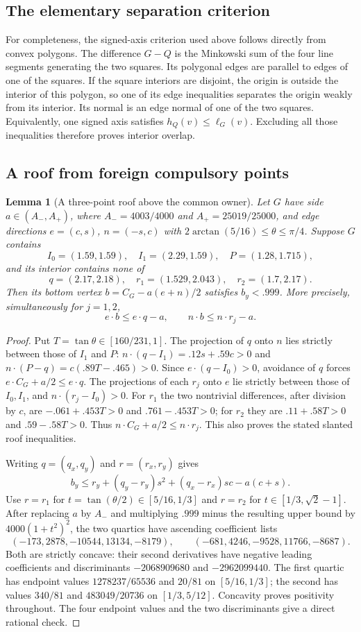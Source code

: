 \documentclass[11pt]{article}
\newtheorem{lemma}[theorem]{Lemma}
\begin{document}
\subsection{The elementary separation criterion}
For completeness, the signed-axis criterion used above follows directly
from convex polygons. The difference $G-Q$ is the Minkowski sum of the
four line segments generating the two squares. Its polygonal edges are
parallel to edges of one of the squares. If the square interiors are
disjoint, the origin is outside the interior of this polygon, so one of
its edge inequalities separates the origin weakly from its interior.
Its normal is an edge normal of one of the two squares. Equivalently,
one signed axis satisfies $h_Q(v)\le\ell_G(v)$. Excluding all those
inequalities therefore proves interior overlap.

\subsection{A roof from foreign compulsory points}
\begin{lemma}[A three-point roof above the common owner]\label{lem:root-roof}
Let $G$ have side $a\in(A_-,A_+)$, where
$A_-=4003/4000$ and $A_+=25019/25000$, and edge directions
$e=(c,s)$, $n=(-s,c)$ with
$2\arctan(5/16)\le\theta\le\pi/4$.
Suppose $G$ contains
\[
 I_0=(1.59,1.59),\quad I_1=(2.29,1.59),\quad P=(1.28,1.715),
\]
and its interior contains none of
\[
 q=(2.17,2.18),\quad r_1=(1.529,2.043),\quad r_2=(1.7,2.17).
\]
Then its bottom vertex $b=C_G-a(e+n)/2$ satisfies $b_y<.999$.
More precisely, simultaneously for $j=1,2$,
\[
 e\cdot b\le e\cdot q-a,\qquad n\cdot b\le n\cdot r_j-a.
\]
\end{lemma}
\begin{proof}
Put $T=\tan\theta\in[160/231,1]$. The projection of $q$ onto
$n$ lies strictly between those of $I_1$ and $P$:
$n\cdot(q-I_1)=.12s+.59c>0$ and
$n\cdot(P-q)=c(.89T-.465)>0$.
Since $e\cdot(q-I_0)>0$, avoidance of $q$ forces
$e\cdot C_G+a/2\le e\cdot q$.
The projections of each $r_j$ onto $e$ lie strictly between those
of $I_0,I_1$, and $n\cdot(r_j-I_0)>0$.
For $r_1$ the two nontrivial differences, after division by $c$,
are $-.061+.453T>0$ and $.761-.453T>0$;
for $r_2$ they are $.11+.58T>0$ and $.59-.58T>0$.
Thus $n\cdot C_G+a/2\le n\cdot r_j$.
This also proves the stated slanted roof inequalities.

Writing $q=(q_x,q_y)$ and $r=(r_x,r_y)$ gives
\[
 b_y\le r_y+(q_y-r_y)s^2+(q_x-r_x)sc-a(c+s).
\]
Use $r=r_1$ for $t=\tan(\theta/2)\in[5/16,1/3]$ and
$r=r_2$ for $t\in[1/3,\sqrt2-1]$.
After replacing $a$ by $A_-$ and multiplying $.999$ minus the resulting upper bound by $4000(1+t^2)^2$, the two quartics have ascending
coefficient lists
\[
 (-173,2878,-10544,13134,-8179),\qquad
 (-681,4246,-9528,11766,-8687).
\]
Both are strictly concave: their second derivatives have negative leading
coefficients and discriminants $-2068909680$ and $-2962099440$.
The first quartic has endpoint values $1278237/65536$ and $20/81$
on $[5/16,1/3]$; the second has values $340/81$ and
$483049/20736$ on $[1/3,5/12]$. Concavity proves positivity throughout.
The four endpoint values and the two discriminants give a direct rational check.
\end{proof}
\end{document}
